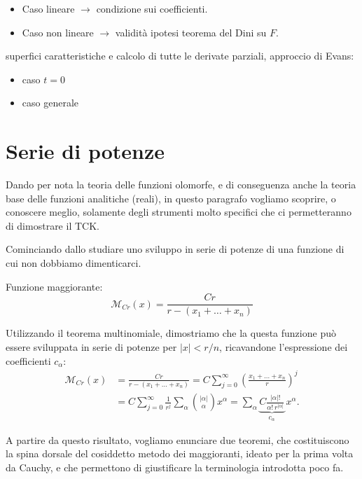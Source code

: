 \begin{remark}
\begin{itemize}
\item Caso lineare $\rightarrow$ condizione sui coefficienti.
\item Caso non lineare $\rightarrow$ validità ipotesi teorema del Dini su $F$.
\end{itemize}
\end{remark}

superfici caratteristiche e calcolo di tutte le derivate parziali, approccio di Evans:
\begin{itemize}
\item caso $t=0$
\item caso generale 
\end{itemize}


\newpage
\section{Serie di potenze}
Dando per nota la teoria delle funzioni olomorfe, e di conseguenza anche la teoria base delle funzioni analitiche (reali), in questo paragrafo vogliamo scoprire, o conoscere meglio, solamente degli strumenti molto specifici che ci permetteranno di dimostrare il TCK.

Cominciando dallo studiare uno sviluppo in serie di potenze di una funzione di cui non dobbiamo dimenticarci.
\begin{definition}
Funzione maggiorante: $$\mathcal{M}_{Cr}(x)=\frac{Cr}{r-(x_1+\ldots +x_n)}$$
\end{definition}
Utilizzando il teorema multinomiale, dimostriamo che la questa funzione può essere sviluppata in serie di potenze per $|x|<r/n$, ricavandone l'espressione dei coefficienti $c_\alpha$:
\begin{align*}
\mathcal{M}_{Cr}(x) &= \frac{Cr}{r-(x_1+\ldots +x_n)} = C \sum\limits_{j=0}^\infty \left(\frac{x_1+\ldots +x_n}{r}\right)^j  \\
&= C \sum\limits_{j=0}^\infty \frac{1}{r^j} \sum\limits_\alpha  \binom{|\alpha |}{\alpha } x^\alpha = \sum\limits_\alpha 
\underbrace{C \frac{|\alpha |!}{\alpha ! \, r^{|\alpha |}}}_{c_\alpha} \, x^\alpha .
\end{align*}

A partire da questo risultato, vogliamo enunciare due teoremi, che costituiscono la spina dorsale del cosiddetto metodo dei maggioranti, ideato per la prima volta da Cauchy, e che permettono di giustificare la terminologia introdotta poco fa.


